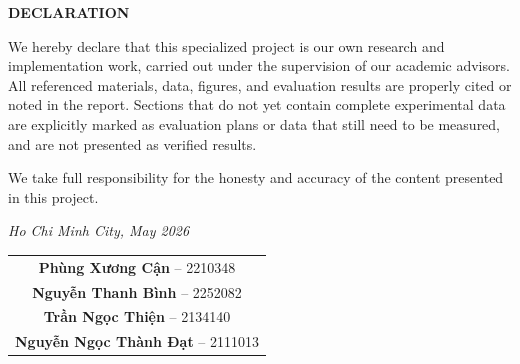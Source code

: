 \begin{center}
    \textbf{\Large DECLARATION}
\end{center}

\vspace{1cm}

We hereby declare that this specialized project is our own research and
implementation work, carried out under the supervision of our academic
advisors. All referenced materials, data, figures, and evaluation results are
properly cited or noted in the report. Sections that do not yet contain
complete experimental data are explicitly marked as evaluation plans or data
that still need to be measured, and are not presented as verified results.

We take full responsibility for the honesty and accuracy of the content
presented in this project.

\vspace{1.5cm}

\begin{flushright}
    \textit{Ho Chi Minh City, May 2026}\\[0.8cm]
    \begin{tabular}{c}
        \textbf{Phùng Xương Cận} -- 2210348 \\[0.8cm]
        \textbf{Nguyễn Thanh Bình} -- 2252082 \\[0.8cm]
        \textbf{Trần Ngọc Thiện} -- 2134140 \\[0.8cm]
        \textbf{Nguyễn Ngọc Thành Đạt} -- 2111013 \\
    \end{tabular}
\end{flushright}
